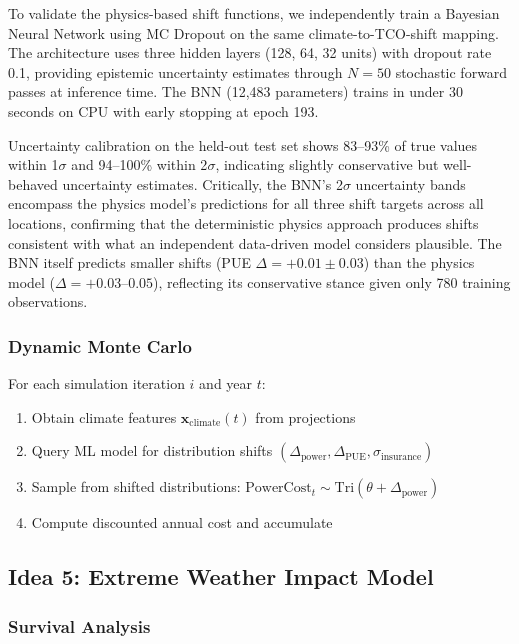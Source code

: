 \documentclass[12pt,a4paper]{article}
\begin{document}
To validate the physics-based shift functions, we independently train a Bayesian Neural Network using MC Dropout \citep{gal2016dropout} on the same climate-to-TCO-shift mapping. The architecture uses three hidden layers (128, 64, 32 units) with dropout rate 0.1, providing epistemic uncertainty estimates through $N=50$ stochastic forward passes at inference time. The BNN (12,483 parameters) trains in under 30 seconds on CPU with early stopping at epoch 193.

Uncertainty calibration on the held-out test set shows 83--93\% of true values within 1$\sigma$ and 94--100\% within 2$\sigma$, indicating slightly conservative but well-behaved uncertainty estimates. Critically, the BNN's 2$\sigma$ uncertainty bands encompass the physics model's predictions for all three shift targets across all locations, confirming that the deterministic physics approach produces shifts consistent with what an independent data-driven model considers plausible. The BNN itself predicts smaller shifts (PUE $\Delta = +0.01 \pm 0.03$) than the physics model ($\Delta = +0.03\text{--}0.05$), reflecting its conservative stance given only 780 training observations.

\subsubsection{Dynamic Monte Carlo}

For each simulation iteration $i$ and year $t$:
\begin{enumerate}
    \item Obtain climate features $\mathbf{x}_{\text{climate}}(t)$ from projections
    \item Query ML model for distribution shifts $(\Delta_{\text{power}}, \Delta_{\text{PUE}}, \sigma_{\text{insurance}})$
    \item Sample from shifted distributions: $\text{PowerCost}_t \sim \text{Tri}(\theta + \Delta_{\text{power}})$
    \item Compute discounted annual cost and accumulate
\end{enumerate}

\subsection{Idea 5: Extreme Weather Impact Model}

\subsubsection{Survival Analysis}
\end{document}
